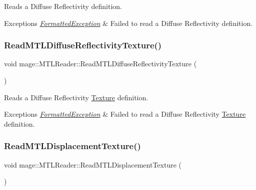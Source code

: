 Reads a Diffuse Reflectivity definition.


\begin{DoxyExceptions}{Exceptions}
{\em \hyperlink{structmage_1_1_formatted_exception}{Formatted\+Exception}} & Failed to read a Diffuse Reflectivity definition. \\
\hline
\end{DoxyExceptions}
\hypertarget{classmage_1_1_m_t_l_reader_ad941332bf48f9fd9f7c4cecf5ae6ccc4}{}\label{classmage_1_1_m_t_l_reader_ad941332bf48f9fd9f7c4cecf5ae6ccc4} 
\subsubsection{\texorpdfstring{Read\+M\+T\+L\+Diffuse\+Reflectivity\+Texture()}{ReadMTLDiffuseReflectivityTexture()}}
{\footnotesize\ttfamily void mage\+::\+M\+T\+L\+Reader\+::\+Read\+M\+T\+L\+Diffuse\+Reflectivity\+Texture (\begin{DoxyParamCaption}{ }\end{DoxyParamCaption})\hspace{0.3cm}{\ttfamily [private]}}

Reads a Diffuse Reflectivity \hyperlink{classmage_1_1_texture}{Texture} definition.


\begin{DoxyExceptions}{Exceptions}
{\em \hyperlink{structmage_1_1_formatted_exception}{Formatted\+Exception}} & Failed to read a Diffuse Reflectivity \hyperlink{classmage_1_1_texture}{Texture} definition. \\
\hline
\end{DoxyExceptions}
\hypertarget{classmage_1_1_m_t_l_reader_a9d4f8dea5a5582c5e7b788149110800c}{}\label{classmage_1_1_m_t_l_reader_a9d4f8dea5a5582c5e7b788149110800c} 
\subsubsection{\texorpdfstring{Read\+M\+T\+L\+Displacement\+Texture()}{ReadMTLDisplacementTexture()}}
{\footnotesize\ttfamily void mage\+::\+M\+T\+L\+Reader\+::\+Read\+M\+T\+L\+Displacement\+Texture (\begin{DoxyParamCaption}{ }\end{DoxyParamCaption})\hspace{0.3cm}{\ttfamily [private]}}


